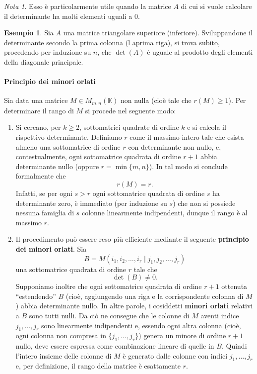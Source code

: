 \documentclass{article}
\theoremstyle{plain}
\theoremstyle{definition}
\newtheorem{exmp}{Esempio}[section]
\theoremstyle{remark}
\newtheorem{note}{Nota}
\begin{document}
\vspace{10pt}

\begin{note}
    Esso è particolarmente utile quando la matrice \( A \) di cui si vuole calcolare il determinante ha molti elementi uguali a $0$. 
\end{note}

\vspace{10pt}

\begin{exmp}
    Sia $A$ una matrice triangolare superiore (inferiore). 
    Sviluppandone il determinante secondo la prima colonna (l aprima riga), si trova subito, procedendo per induzione su $n$, che $\det(A)$ è uguale al prodotto degli elementi della diagonale principale.
\end{exmp}

\vspace{10pt}

\paragraph{Principio dei minori orlati}
Sia data una matrice $M\in M_{m,n}(\mathbb{K})$
non nulla (cioè tale che \( r(M) \ge 1 \)). Per determinare il rango di \( M \) si procede nel seguente modo:
\begin{enumerate}
    \item Si cercano, per \( k\geq 2 \), sottomatrici quadrate di ordine \( k \) e si calcola il rispettivo determinante. Definiamo \( r \) come il massimo intero tale che esista almeno una sottomatrice di ordine \( r \) con determinante non nullo, e, contestualmente, ogni sottomatrice quadrata di ordine \( r+1 \) abbia determinante nullo (oppure \( r=\min\{m,n\} \)). In tal modo si conclude formalmente che
    \[
    r(M)=r.
    \]
    Infatti, se per ogni \( s>r \) ogni sottomatrice quadrata di ordine \( s \) ha determinante zero, è immediato (per induzione su \( s \)) che non si possiede nessuna famiglia di \( s \) colonne linearmente indipendenti, dunque il rango è al massimo \( r \).
    \item Il procedimento può essere reso più efficiente mediante il seguente \textbf{principio dei minori orlati}. Sia
    \[
    B=M(i_1, i_2,\dots, i_r \mid j_1, j_2,\dots, j_r)
    \]
    una sottomatrice quadrata di ordine \( r \) tale che
    \[
    \det(B)\neq 0.
    \]
    Supponiamo inoltre che ogni sottomatrice quadrata di ordine \( r+1 \) ottenuta “estendendo” \( B \) (cioè, aggiungendo una riga e la corrispondente colonna di \( M \)) abbia determinante nullo. In altre parole, i cosiddetti \textbf{minori orlati} relativi a \( B \) sono tutti nulli.
    Da ciò ne consegue che le colonne di \( M \) aventi indice \( j_1,\dots,j_r \) sono linearmente indipendenti e, essendo ogni altra colonna (cioè, ogni colonna non compresa in \( \{j_1,\dots,j_r\} \)) genera un minore di ordine \( r+1 \) nullo, deve essere espressa come combinazione lineare di quelle in \( B \). Quindi l'intero insieme delle colonne di \( M \) è generato dalle colonne con indici \( j_1,\dots,j_r \) e, per definizione, il rango della matrice è esattamente \( r \).
\end{enumerate}
\end{document}
